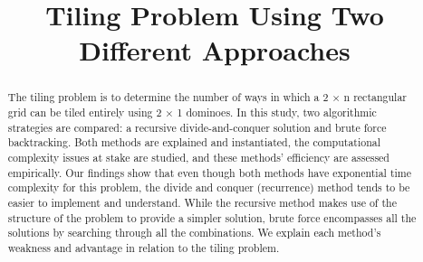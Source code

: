 \documentclass[conference]{IEEEtran}
\begin{document}
\title{Tiling Problem Using Two Different Approaches\\
}

\author{
\and
{}
\and
{}
\and
{}
\and
{}
\and
{}
}

\maketitle

\begin{abstract}
The tiling problem is to determine the number of ways in which a 2 × n rectangular grid can be tiled entirely using 2 × 1 dominoes. In this study, two algorithmic strategies are compared: a recursive divide-and-conquer solution and brute force backtracking. Both methods are explained and instantiated, the computational complexity issues at stake are studied, and these methods' efficiency are assessed empirically. Our findings show that even though both methods have exponential time complexity for this problem, the divide and conquer (recurrence) method tends to be easier to implement and understand. While the recursive method makes use of the structure of the problem to provide a simpler solution, brute force encompasses all the solutions by searching through all the combinations. We explain each method's weakness and advantage in relation to the tiling problem.
\end{abstract}
\end{document}
